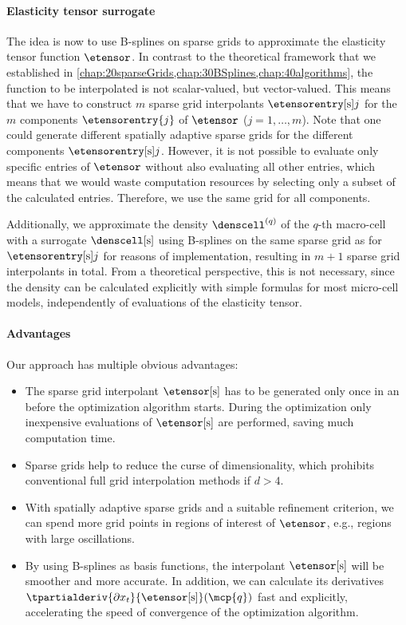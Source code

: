 \paragraph{Elasticity tensor surrogate}

The idea is now to use B-splines on sparse grids to approximate
the elasticity tensor function $\etensor$.
In contrast to the theoretical framework that we established in
\cref{chap:20sparseGrids,chap:30BSplines,chap:40algorithms},
the function to be interpolated is not scalar-valued, but vector-valued.
This means that we have to construct $m$ sparse grid interpolants
$\etensorentryintp{j}$
for the $m$ components $\etensorentry{j}$ of $\etensor$ ($j = 1, \dotsc, m$).
Note that one could generate different spatially adaptive sparse grids for the
different components $\etensorentryintp{j}$.
However, it is not possible to evaluate only specific entries of $\etensor$
without also evaluating all other entries,
which means that we would waste computation resources by selecting only
a subset of the calculated entries.
Therefore, we use the same grid for all components.

Additionally, we approximate the density $\denscell^{(q)}$
of the $q$-th macro-cell with a surrogate $\denscellintp$ using
B-splines on the same sparse grid as for $\etensorentryintp{j}$
for reasons of implementation,
resulting in $m + 1$ sparse grid interpolants in total.
From a theoretical perspective, this is not necessary,
since the density can be calculated explicitly with simple formulas
for most micro-cell models, independently of evaluations of the
elasticity tensor.

\paragraph{Advantages}

Our approach has multiple obvious advantages:
\begin{itemize}
  \item
  The sparse grid interpolant $\etensorintp$ has to be generated only
  once in an  before the optimization algorithm starts.
  During the optimization 
  only inexpensive evaluations of $\etensorintp$ are performed,
  saving much computation time.
  
  \item
  Sparse grids help to reduce the curse of dimensionality, which prohibits
  conventional full grid interpolation methods if $d > 4$.
  
  \item
  With spatially adaptive sparse grids and a suitable refinement criterion,
  we can spend more grid points in regions of interest of $\etensor$,
  e.g., regions with large oscillations.
  
  \item
  By using B-splines as basis functions,
  the interpolant $\etensorintp$ will be smoother and more accurate.
  In addition, we can calculate its derivatives
  $\tpartialderiv{\partialdiff{} x_t}{\etensorintp}(\mcp{q})$
  fast and explicitly,
  accelerating the speed of convergence of the optimization algorithm.
\end{itemize}



